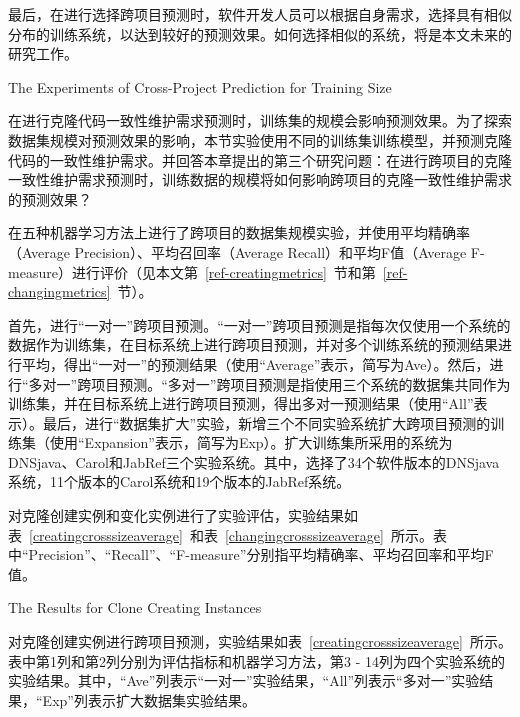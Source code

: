 最后，在进行选择跨项目预测时，软件开发人员可以根据自身需求，选择具有相似分布的训练系统，以达到较好的预测效果。如何选择相似的系统，将是本文未来的研究工作。


{The Experiments of Cross-Project Prediction for Training Size}

在进行克隆代码一致性维护需求预测时，训练集的规模会影响预测效果。为了探索数据集规模对预测效果的影响，本节实验使用不同的训练集训练模型，并预测克隆代码的一致性维护需求。并回答本章提出的第三个研究问题：在进行跨项目的克隆一致性维护需求预测时，训练数据的规模将如何影响跨项目的克隆一致性维护需求的预测效果？

在五种机器学习方法上进行了跨项目的数据集规模实验，并使用平均精确率（Average Precision）、平均召回率（Average Recall）和平均F值（Average F-measure）进行评价（见本文第~\ref{ref-creatingmetrics}~节和第~\ref{ref-changingmetrics}~节）。

首先，进行“一对一”跨项目预测。“一对一”跨项目预测是指每次仅使用一个系统的数据作为训练集，在目标系统上进行跨项目预测，并对多个训练系统的预测结果进行平均，得出“一对一”的预测结果（使用“Average”表示，简写为Ave）。然后，进行“多对一”跨项目预测。“多对一”跨项目预测是指使用三个系统的数据集共同作为训练集，并在目标系统上进行跨项目预测，得出多对一预测结果（使用“All”表示）。最后，进行“数据集扩大”实验，新增三个不同实验系统扩大跨项目预测的训练集（使用“Expansion”表示，简写为Exp）。扩大训练集所采用的系统为DNSjava、Carol和JabRef三个实验系统。其中，选择了34个软件版本的DNSjava系统，11个版本的Carol系统和19个版本的JabRef系统。

对克隆创建实例和变化实例进行了实验评估，实验结果如表~\ref{creatingcrosssizeaverage}~和表~\ref{changingcrosssizeaverage}~所示。表中“Precision”、“Recall”、“F-measure”分别指平均精确率、平均召回率和平均F值。



{The Results for Clone Creating Instances}

对克隆创建实例进行跨项目预测，实验结果如表~\ref{creatingcrosssizeaverage}~所示。表中第1列和第2列分别为评估指标和机器学习方法，第3 - 14列为四个实验系统的实验结果。其中，“Ave”列表示“一对一”实验结果，“All”列表示“多对一”实验结果，“Exp”列表示扩大数据集实验结果。

